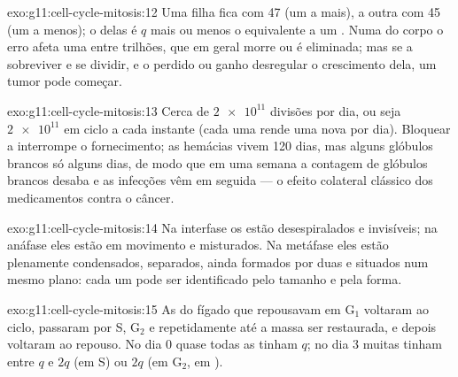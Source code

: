 \begin{solution}{exo:g11:cell-cycle-mitosis:12}
Uma filha fica com 47  (um a mais), a outra com 45 (um a
menos); o  delas é $q$ mais ou menos o equivalente a um .
Numa  do corpo o erro afeta uma  entre trilhões, que em
geral morre ou é eliminada; mas se a  sobreviver e se dividir, e
o  perdido ou ganho desregular o crescimento dela, um tumor
pode começar.
\end{solution}

\begin{solution}{exo:g11:cell-cycle-mitosis:13}
Cerca de $\num{2e11}$ divisões por dia, ou seja $\num{2e11}$  em
ciclo a cada instante (cada uma rende uma  nova por dia).
Bloquear a  interrompe o fornecimento; as hemácias vivem 120
dias, mas alguns glóbulos brancos só alguns dias, de modo que em uma
semana a contagem de glóbulos brancos desaba e as infecções vêm em
seguida --- o efeito colateral clássico dos medicamentos contra o
câncer.
\end{solution}

\begin{solution}{exo:g11:cell-cycle-mitosis:14}
Na interfase os  estão desespiralados e invisíveis; na
anáfase eles estão em movimento e misturados. Na metáfase eles estão
plenamente condensados, separados, ainda formados por duas  e
situados num mesmo plano: cada um pode ser identificado pelo tamanho e
pela forma.
\end{solution}

\begin{solution}{exo:g11:cell-cycle-mitosis:15}
As  do fígado que repousavam em $\mathrm{G_1}$ voltaram ao
ciclo, passaram por S, $\mathrm{G_2}$ e  repetidamente até a
massa ser restaurada, e depois voltaram ao repouso. No dia 0 quase
todas as  tinham $q$; no dia 3 muitas tinham entre $q$ e $2q$
(em S) ou $2q$ (em $\mathrm{G_2}$, em ).
\end{solution}


